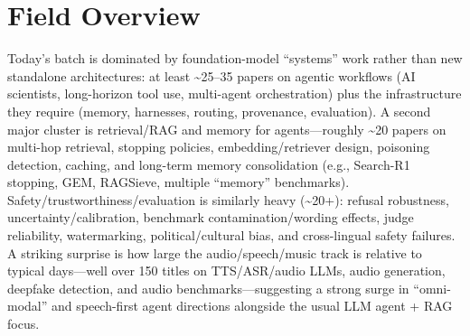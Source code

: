 \documentclass[12pt,letterpaper]{article}
\begin{document}
\medskip



\section*{Field Overview}
{\footnotesize Today's batch is dominated by foundation-model ``systems'' work rather than new standalone architectures: at least \textasciitilde{}25--35 papers on agentic workflows (AI scientists, long-horizon tool use, multi-agent orchestration) plus the infrastructure they require (memory, harnesses, routing, provenance, evaluation). A second major cluster is retrieval/RAG and memory for agents---roughly \textasciitilde{}20 papers on multi-hop retrieval, stopping policies, embedding/retriever design, poisoning detection, caching, and long-term memory consolidation (e.g., Search-R1 stopping, GEM, RAGSieve, multiple ``memory'' benchmarks). Safety/trustworthiness/evaluation is similarly heavy (\textasciitilde{}20+): refusal robustness, uncertainty/calibration, benchmark contamination/wording effects, judge reliability, watermarking, political/cultural bias, and cross-lingual safety failures. A striking surprise is how large the audio/speech/music track is relative to typical days---well over 150 titles on TTS/ASR/audio LLMs, audio generation, deepfake detection, and audio benchmarks---suggesting a strong surge in ``omni-modal'' and speech-first agent directions alongside the usual LLM agent + RAG focus.}
\end{document}
